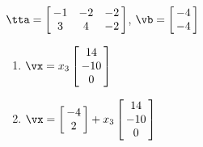 {$\tta = \left[\hskip -3pt \begin{array}{ccc} -1&-2&-2\\  3&4&-2
\end{array}\hskip -3pt \right] $, $\vb=\left[\hskip -3pt \begin{array}{c} -4\\  -4\end{array}\hskip -3pt \right]$}
{\begin{enumerate}
\item	 $\vx=x_3\left[\hskip -3pt \begin{array}{c} 14\\  -10\\  0\end{array}\hskip -3pt \right]$
\item	 $\vx=\left[\hskip -3pt \begin{array}{c} -4\\  2\end{array}\hskip -3pt
\right]+x_3\left[\hskip -3pt \begin{array}{c} 14\\  -10\\  0\end{array}\hskip -3pt \right]$ 
\end{enumerate}
 }

 

 






